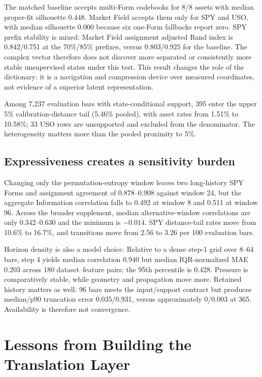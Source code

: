 \documentclass{article}
\newcommand{\method}{Market Field}
\begin{document}
The matched baseline accepts multi-Form codebooks for 8/8 assets with median proper-fit silhouette 0.448. \method{} accepts them only for SPY and USO, with median silhouette 0.000 because six one-Form fallbacks report zero. SPY prefix stability is mixed: \method{} assignment adjusted Rand index is 0.842/0.751 at the 70\%/85\% prefixes, versus 0.803/0.925 for the baseline. The complex vector therefore does not discover more separated or consistently more stable unsupervised states under this test. This result changes the role of the dictionary: it is a navigation and compression device over measured coordinates, not evidence of a superior latent representation.

Among 7,237 evaluation bars with state-conditional support, 395 enter the upper 5\% calibration-distance tail (5.46\% pooled), with asset rates from 1.51\% to 10.58\%; 33 USO rows are unsupported and excluded from the denominator. The heterogeneity matters more than the pooled proximity to 5\%.

\subsection{Expressiveness creates a sensitivity burden}

Changing only the permutation-entropy window leaves two long-history SPY Forms and assignment agreement of 0.878--0.908 against window 24, but the aggregate Information correlation falls to 0.492 at window 8 and 0.511 at window 96. Across the broader supplement, median alternative-window correlations are only 0.342--0.630 and the minimum is $-0.014$. SPY distance-tail rates move from 10.6\% to 16.7\%, and transitions move from 2.56 to 3.26 per 100 evaluation bars.

Horizon density is also a model choice. Relative to a dense step-1 grid over 8--64 bars, step 4 yields median correlation 0.940 but median IQR-normalized MAE 0.203 across 180 dataset--feature pairs; the 95th percentile is 0.428. Pressure is comparatively stable, while geometry and propagation move more. Retained history matters as well: 96 bars meets the input/support contract but produces median/p90 truncation error 0.035/0.931, versus approximately 0/0.003 at 365. Availability is therefore not convergence.

\section{Lessons from Building the Translation Layer}
\label{sec:lessons}
\end{document}
